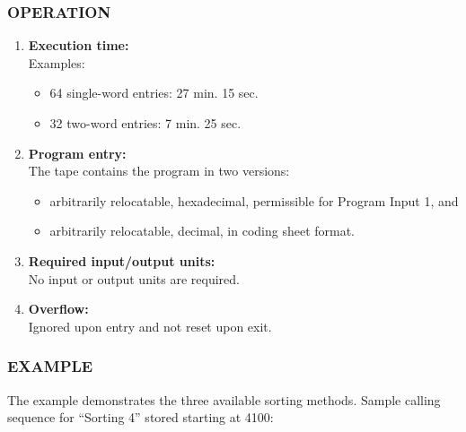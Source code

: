\subsubsection*{OPERATION}
\begin{enumerate}
    \item \textbf{Execution time:} \\
    Examples:
    \begin{itemize}
        \item 64 single-word entries: 27 min. 15 sec.
        \item 32 two-word entries: 7 min. 25 sec.
    \end{itemize}
    \item \textbf{Program entry:} \\
    The tape contains the program in two versions:
    \begin{itemize}
        \item[a)] arbitrarily relocatable, hexadecimal, permissible for Program Input 1, and
        \item[b)] arbitrarily relocatable, decimal, in coding sheet format.
    \end{itemize}
    \item \textbf{Required input/output units:} \\
    No input or output units are required.
    \item \textbf{Overflow:} \\
    Ignored upon entry and not reset upon exit.
\end{enumerate}

\subsubsection*{EXAMPLE}
The example demonstrates the three available sorting methods. Sample calling sequence for ``Sorting 4'' stored starting at 4100:

